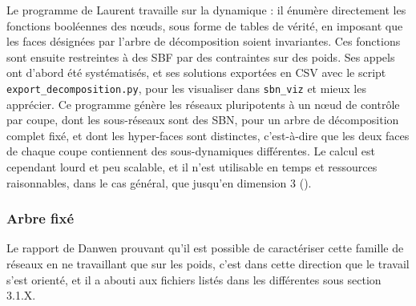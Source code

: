 \documentclass[12pt, a4paper]{article}
\begin{document}
Le programme de Laurent travaille sur la dynamique : il énumère directement les fonctions booléennes des nœuds, sous forme de tables de vérité, en imposant que les faces désignées par l'arbre de décomposition soient invariantes.
Ces fonctions sont ensuite restreintes à des SBF par des contraintes sur des poids.
Ses appels ont d'abord été systématisés, et ses solutions exportées en CSV avec le script \texttt{export\_decomposition.py}, pour les visualiser dans \texttt{sbn\_viz} et mieux les apprécier.
Ce programme génère les réseaux pluripotents à un nœud de contrôle par coupe, dont les sous-réseaux sont des SBN, pour un arbre de décomposition complet fixé, et dont les hyper-faces sont distinctes, c'est-à-dire que les deux faces de chaque coupe contiennent des sous-dynamiques différentes.
Le calcul est cependant lourd et peu scalable, et il n'est utilisable en temps et ressources raisonnables, dans le cas général, que jusqu'en dimension 3 ().

\subsubsection{Arbre fixé}

Le rapport de Danwen prouvant qu'il est possible de caractériser cette famille de réseaux en ne travaillant que sur les poids, c'est dans cette direction que le travail s'est orienté, et il a abouti aux fichiers listés dans les différentes sous section 3.1.X.
\end{document}
